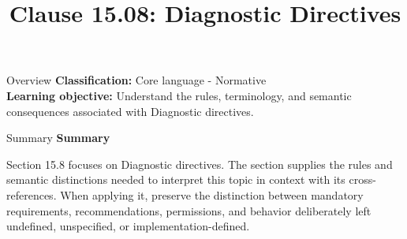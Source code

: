 \documentclass[10pt,letterpaper]{article}
\title{Clause 15.08: Diagnostic Directives}
\author{}
\date{}
\begin{document}
\maketitle
\begin{CornellOverviewBox}{Overview}
\textbf{Classification:} Core language - Normative\\[2pt]
\textbf{Learning objective:} Understand the rules, terminology, and semantic consequences associated with Diagnostic directives.
\end{CornellOverviewBox}\begin{CornellSummaryBox}{Summary}
{\sffamily\bfseries\color{Accent} Summary}\par\vspace{3pt}Section 15.8 focuses on Diagnostic directives. The section supplies the rules and semantic distinctions needed to interpret this topic in context with its cross-references. When applying it, preserve the distinction between mandatory requirements, recommendations, permissions, and behavior deliberately left undefined, unspecified, or implementation-defined.
\end{CornellSummaryBox}
\end{document}
